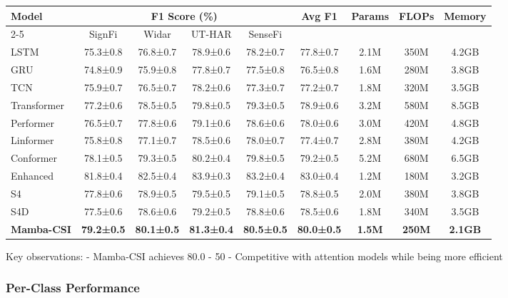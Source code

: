 \documentclass[10pt,journal,compsoc]{IEEEtran}
\begin{document}
\begin{table*}[h]
\centering
\caption{Overall performance comparison across datasets (mean ± std over 5 runs)}
\label{tab:overall_results}
\begin{tabular}{lcccccccc}
\toprule
\multirow{2}{*}{Model} & \multicolumn{4}{c}{F1 Score (\%)} & \multirow{2}{*}{Avg F1} & \multirow{2}{*}{Params} & \multirow{2}{*}{FLOPs} & \multirow{2}{*}{Memory} \\
\cmidrule(lr){2-5}
 & SignFi & Widar & UT-HAR & SenseFi & & & & \\
\midrule
LSTM & 75.3±0.8 & 76.8±0.7 & 78.9±0.6 & 78.2±0.7 & 77.8±0.7 & 2.1M & 350M & 4.2GB \\
GRU & 74.8±0.9 & 75.9±0.8 & 77.8±0.7 & 77.5±0.8 & 76.5±0.8 & 1.6M & 280M & 3.8GB \\
TCN & 75.9±0.7 & 76.5±0.7 & 78.2±0.6 & 77.3±0.7 & 77.2±0.7 & 1.8M & 320M & 3.5GB \\
\midrule
Transformer & 77.2±0.6 & 78.5±0.5 & 79.8±0.5 & 79.3±0.5 & 78.9±0.6 & 3.2M & 580M & 8.5GB \\
Performer & 76.5±0.7 & 77.8±0.6 & 79.1±0.6 & 78.6±0.6 & 78.0±0.6 & 3.0M & 420M & 4.8GB \\
Linformer & 75.8±0.8 & 77.1±0.7 & 78.5±0.6 & 78.0±0.7 & 77.4±0.7 & 2.8M & 380M & 4.2GB \\
\midrule
Conformer & 78.1±0.5 & 79.3±0.5 & 80.2±0.4 & 79.8±0.5 & 79.2±0.5 & 5.2M & 680M & 6.5GB \\
Enhanced & 81.8±0.4 & 82.5±0.4 & 83.9±0.3 & 83.2±0.4 & 83.0±0.4 & 1.2M & 180M & 3.2GB \\
\midrule
S4 & 77.8±0.6 & 78.9±0.5 & 79.5±0.5 & 79.1±0.5 & 78.8±0.5 & 2.0M & 380M & 3.8GB \\
S4D & 77.5±0.6 & 78.6±0.6 & 79.2±0.5 & 78.8±0.6 & 78.5±0.6 & 1.8M & 340M & 3.5GB \\
\midrule
\textbf{Mamba-CSI} & \textbf{79.2±0.5} & \textbf{80.1±0.5} & \textbf{81.3±0.4} & \textbf{80.5±0.5} & \textbf{80.0±0.5} & \textbf{1.5M} & \textbf{250M} & \textbf{2.1GB} \\
\bottomrule
\end{tabular}
\end{table*}

Key observations:
- Mamba-CSI achieves 80.0%
- 50%
- Competitive with attention models while being more efficient

\subsubsection{Per-Class Performance}
\end{document}
